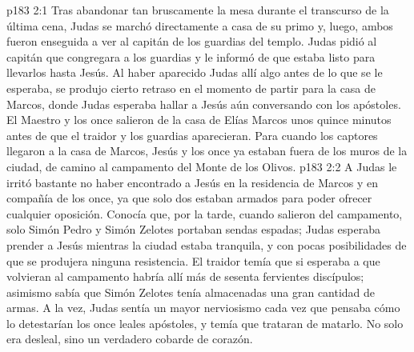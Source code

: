 \vs p183 2:1 Tras abandonar tan bruscamente la mesa durante el transcurso de la última cena, Judas se marchó directamente a casa de su primo y, luego, ambos fueron enseguida a ver al capitán de los guardias del templo. Judas pidió al capitán que congregara a los guardias y le informó de que estaba listo para llevarlos hasta Jesús. Al haber aparecido Judas allí algo antes de lo que se le esperaba, se produjo cierto retraso en el momento de partir para la casa de Marcos, donde Judas esperaba hallar a Jesús aún conversando con los apóstoles. El Maestro y los once salieron de la casa de Elías Marcos unos quince minutos antes de que el traidor y los guardias aparecieran. Para cuando los captores llegaron a la casa de Marcos, Jesús y los once ya estaban fuera de los muros de la ciudad, de camino al campamento del Monte de los Olivos.
\vs p183 2:2 A Judas le irritó bastante no haber encontrado a Jesús en la residencia de Marcos y en compañía de los once, ya que solo dos estaban armados para poder ofrecer cualquier oposición. Conocía que, por la tarde, cuando salieron del campamento, solo Simón Pedro y Simón Zelotes portaban sendas espadas; Judas esperaba prender a Jesús mientras la ciudad estaba tranquila, y con pocas posibilidades de que se produjera ninguna resistencia. El traidor temía que si esperaba a que volvieran al campamento habría allí más de sesenta fervientes discípulos; asimismo sabía que Simón Zelotes tenía almacenadas una gran cantidad de armas. A la vez, Judas sentía un mayor nerviosismo cada vez que pensaba cómo lo detestarían los once leales apóstoles, y temía que trataran de matarlo. No solo era desleal, sino un verdadero cobarde de corazón.

